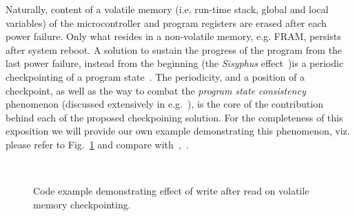 Naturally, content of a volatile memory (i.e. run-time stack, global and local variables) of the microcontroller and program registers are erased after each power failure. Only what resides in a non-volatile memory, e.g. FRAM, persists after system reboot. A solution to sustain the progress of the program from the last power failure, instead from the beginning (the \emph{Sisyphus} effect~\cite[Sec. 2]{mementos})is a periodic checkpointing of a program state~\cite{mementos,hibernusplusplus,quickrecall,idetic}. The periodicity, and a position of a checkpoint, as well as the way to combat the \emph{program state consistency} phenomenon (discussed extensively in e.g.~\cite{chain,alpaca}), is the core of the contribution behind each of the proposed checkpoining solution. For the completeness of this exposition we will provide our own example demonstrating this phenomenon, viz. please refer to Fig.~\ref{fig:code_demo_incosistency} and compare with~\cite[Sec 2.3]{alpaca},~\cite[Sec. 2.1]{chain}.

\begin{figure}
	\centering
	\\
	\caption{Code example demonstrating effect of write after read on volatile memory checkpointing.}
	\label{fig:code_demo_incosistency}
\end{figure}

